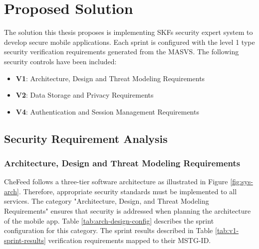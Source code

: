 

\section{Proposed Solution}
The solution this thesis proposes is implementing SKFs security expert system to develop secure mobile applications. Each sprint is configured with the level 1 type security verification requirements generated from the MASVS. The following security controls have been included:

\begin{itemize}
    \item \textbf{V1}: Architecture, Design and Threat Modeling Requirements
    \item \textbf{V2}: Data Storage and Privacy Requirements
    \item \textbf{V4}: Authentication and Session Management Requirements
\end{itemize}

\subsection{Security Requirement Analysis}

\subsubsection{Architecture, Design and Threat Modeling Requirements}
CheFeed follows a three-tier software architecture as illustrated in Figure \ref{fig:sys-arch}. Therefore, appropriate security standards must be implemented to all services. The category "Architecture, Design, and Threat Modeling Requirements" ensures that security is addressed when planning the architecture of the mobile app. Table \ref{tab:arch-design-config} describes the sprint configuration for this category. The sprint results described in Table \ref{tab:v1-sprint-results} verification requirements mapped to their MSTG-ID.

